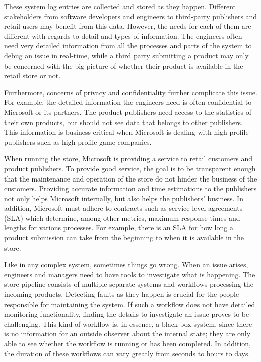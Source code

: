 These system log entries are collected and stored as they happen. 
Different stakeholders from software developers and engineers to third-party publishers and retail users 
may benefit from this data. However, the needs for each of them are
different with regards to detail and types of information.
The engineers often need very detailed information from all the processes and parts of the system to debug an issue in real-time,
while a third party submitting a product may only be concerned with the big picture of whether their 
product is available in the retail store or not.

Furthermore, concerns of privacy and confidentiality further complicate this issue.
For example, the detailed information the engineers need is often confidential to Microsoft or its partners.
The product publishers need access to the statistics of their own products, but should not see data that belongs to other publishers.
This information is business-critical when Microsoft is dealing with high profile publishers such as high-profile game companies.

When running the store, Microsoft is providing a service to retail customers and product publishers.
To provide good service, the goal is to be transparent enough that the maintenance and operation of the store do not hinder the business of the customers. 
Providing accurate information and time estimations to the publishers
not only helps Microsoft internally, but also helps the publishers' business.
In addition, Microsoft must adhere to contracts such as
service level agreements (SLA) which determine, among other metrics, 
maximum response times and lengths for various processes.
For example, there is an SLA for how long a product submission can take from the beginning to when it is available in the store.

Like in any complex system, sometimes things go wrong.
When an issue arises, engineers and managers need to have tools to investigate what is happening. 
The store pipeline consists of multiple separate systems and workflows processing the incoming products.
Detecting faults as they happen is crucial for the people responsible for maintaining the system.
If such a workflow does not have detailed monitoring functionality, 
finding the details to investigate an issue proves to be challenging.
This kind of workflow is, in essence, a black box system, since there is no information for an outside observer
about the internal state;
they are only able to see whether the workflow is running or has been completed.
In addition, the duration of these workflows can vary greatly from seconds to hours to days.

